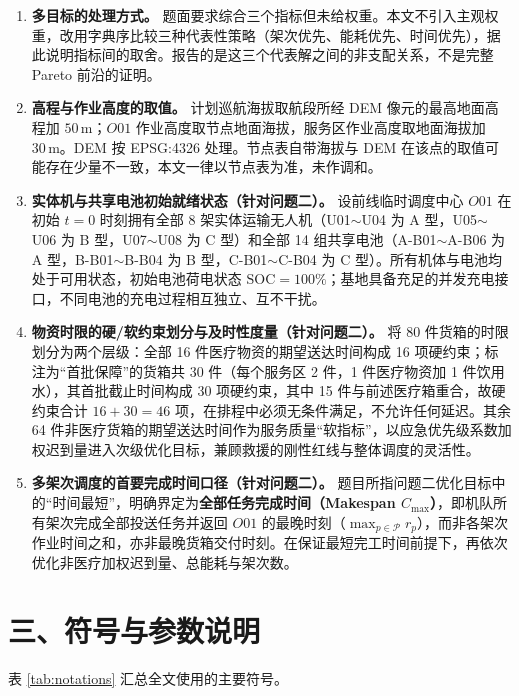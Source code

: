 \documentclass[withoutpreface,bwprint]{format}
\begin{document}
\begin{enumerate}[label=\textbf{假设 \arabic*：}, leftmargin=*]
    \item \textbf{多目标的处理方式。} 题面要求综合三个指标但未给权重。本文不引入主观权重，改用字典序比较三种代表性策略（架次优先、能耗优先、时间优先），据此说明指标间的取舍。报告的是这三个代表解之间的非支配关系，不是完整 Pareto 前沿的证明。

    \item \textbf{高程与作业高度的取值。} 计划巡航海拔取航段所经 DEM 像元的最高地面高程加 $50\,\text{m}$；$O01$ 作业高度取节点地面海拔，服务区作业高度取地面海拔加 $30\,\text{m}$。DEM 按 EPSG:4326 处理。节点表自带海拔与 DEM 在该点的取值可能存在少量不一致，本文一律以节点表为准，未作调和。

    \item \textbf{实体机与共享电池初始就绪状态（针对问题二）。} 设前线临时调度中心 $O01$ 在初始 $t=0$ 时刻拥有全部 8 架实体运输无人机（U01$\sim$U04 为 A 型，U05$\sim$U06 为 B 型，U07$\sim$U08 为 C 型）和全部 14 组共享电池（A-B01$\sim$A-B06 为 A 型，B-B01$\sim$B-B04 为 B 型，C-B01$\sim$C-B04 为 C 型）。所有机体与电池均处于可用状态，初始电池荷电状态 $\text{SOC}=100\%$；基地具备充足的并发充电接口，不同电池的充电过程相互独立、互不干扰。

    \item \textbf{物资时限的硬/软约束划分与及时性度量（针对问题二）。} 将 80 件货箱的时限划分为两个层级：全部 16 件医疗物资的期望送达时间构成 16 项硬约束；标注为“首批保障”的货箱共 30 件（每个服务区 2 件，1 件医疗物资加 1 件饮用水），其首批截止时间构成 30 项硬约束，其中 15 件与前述医疗箱重合，故硬约束合计 $16+30=46$ 项，在排程中必须无条件满足，不允许任何延迟。其余 64 件非医疗货箱的期望送达时间作为服务质量“软指标”，以应急优先级系数加权迟到量进入次级优化目标，兼顾救援的刚性红线与整体调度的灵活性。

    \item \textbf{多架次调度的首要完成时间口径（针对问题二）。} 题目所指问题二优化目标中的“时间最短”，明确界定为\textbf{全部任务完成时间（Makespan $C_{\max}$）}，即机队所有架次完成全部投送任务并返回 $O01$ 的最晚时刻（$\max_{p \in \mathcal{P}} r_p$），而非各架次作业时间之和，亦非最晚货箱交付时刻。在保证最短完工时间前提下，再依次优化非医疗加权迟到量、总能耗与架次数。
\end{enumerate}



\clearpage
\section{三、符号与参数说明}

表 \ref{tab:notations} 汇总全文使用的主要符号。
\end{document}
